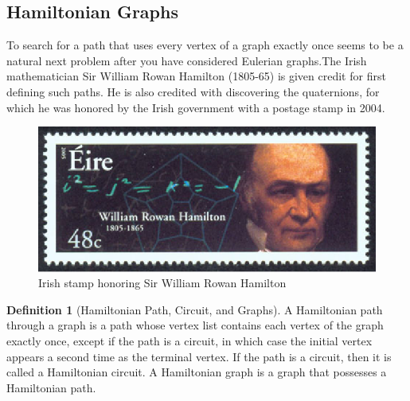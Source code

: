 \documentclass[10pt,]{book}
\theoremstyle{plain}
\theoremstyle{definition}
\newtheorem{definition}[theorem]{Definition}
\theoremstyle{definition}
\theoremstyle{definition}
\theoremstyle{definition}
\theoremstyle{definition}
\numberwithin{equation}{section}
\begin{document}
\subsection[Hamiltonian Graphs]{Hamiltonian Graphs}\label{ss-hamiltonian-graphs}
To search for a path that uses every vertex of a graph exactly once seems to be a natural next problem after you have considered Eulerian graphs.The Irish mathematician Sir William Rowan Hamilton (1805-65) is given credit for first defining such paths. He is also credited with discovering the quaternions, for which he was honored by the Irish government with a postage stamp in 2004.%
\leavevmode%
\begin{figure}
\centering
\includegraphics[width=1\linewidth]{images/fig-hamilton-stamp.png}
\caption{Irish stamp honoring Sir William Rowan Hamilton
                \label{fig-hamilton-stamp}}
\end{figure}
\begin{definition}[Hamiltonian Path, Circuit, and Graphs]\label{def-hamiltonian-path-circuit-graph}
A Hamiltonian path through a graph is a path whose vertex list contains each vertex of the graph exactly once, except if the path is a circuit, in which case the initial vertex appears a second time as the terminal vertex. If the path is a circuit, then it is called a Hamiltonian circuit. A Hamiltonian graph is a graph that possesses a Hamiltonian path.%
\end{definition}
\end{document}
